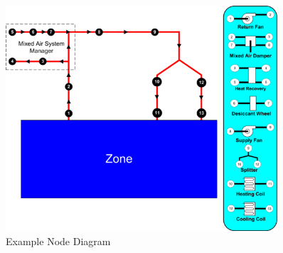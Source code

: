 \begin{figure}[hbtp] 
\centering
\includegraphics[width=0.9\textwidth, height=0.9\textheight, keepaspectratio=true]{media/NodeDiagram.png}
\caption{Example Node Diagram}
\end{figure}

